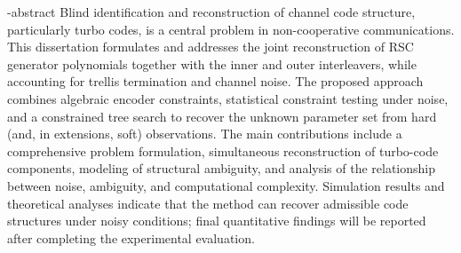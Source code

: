 
\en-abstract{
Blind identification and reconstruction of channel code structure, particularly turbo codes, is a central problem in non-cooperative communications. This dissertation formulates and addresses the joint reconstruction of RSC generator polynomials together with the inner and outer interleavers, while accounting for trellis termination and channel noise. The proposed approach combines algebraic encoder constraints, statistical constraint testing under noise, and a constrained tree search to recover the unknown parameter set from hard (and, in extensions, soft) observations. The main contributions include a comprehensive problem formulation, simultaneous reconstruction of turbo-code components, modeling of structural ambiguity, and analysis of the relationship between noise, ambiguity, and computational complexity. Simulation results and theoretical analyses indicate that the method can recover admissible code structures under noisy conditions; final quantitative findings will be reported after completing the experimental evaluation.
}
